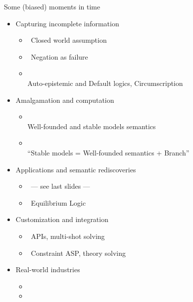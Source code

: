 \begin{frame}{Some (biased) moments in time}
  \bigskip
  \begin{itemize}
  \item<1-> Capturing incomplete information
    \begin{itemize}
    \item<only@2>  \ Closed world assumption
    \item<only@2>  \ Negation as failure
    \item<only@2> \\ Auto-epistemic and Default logics, Circumscription
    \end{itemize}
    \smallskip
  \item<1-> Amalgamation and computation
    \begin{itemize}
    \item<only@3> \\ Well-founded and stable models semantics
    \item<only@3> \\ ``Stable models = Well-founded semantics + Branch''
    \end{itemize}
    \smallskip
  \item<1-> Applications and semantic rediscoveries
    \begin{itemize}
    \item<only@4>  \ --- see last slides ---
    \item<only@4>    \ Equilibrium Logic
    \end{itemize}
    \smallskip
  \item<1-> Customization and integration
    \begin{itemize}
    \item <only@5>  \ APIs, multi-shot solving
    \item <only@5>  \ Constraint ASP, theory solving
    \end{itemize}
    \smallskip
  \item <only@7->  Real-world industries
    \begin{itemize}
    \item <only@8> 
    \item <only@8> 
    \end{itemize}
  \end{itemize}
\end{frame}
%
